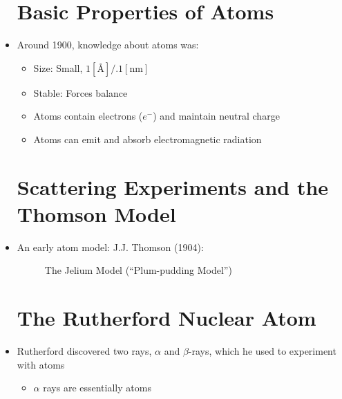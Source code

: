\begin{itemize}

    \section{Basic Properties of Atoms}

  \item Around 1900, knowledge about atoms was:

    \begin{itemize}

      \item Size: Small, $1[\si{\angstrom}]/.1[\si{\nano\meter}]$

      \item Stable: Forces balance

      \item Atoms contain electrons ($e^-$) and maintain neutral charge

      \item Atoms can emit and absorb electromagnetic radiation

    \end{itemize}

    \section{Scattering Experiments and the Thomson Model}

  \item An early atom model: J.J. Thomson (1904):

    \begin{figure}[h!]
      \centering
      
      \caption{The Jelium Model (``Plum-pudding Model'')}
      \label{fig:1}
    \end{figure}

    \section{The Rutherford Nuclear Atom}

  \item Rutherford discovered two rays, $\alpha$ and $\beta$-rays, which he used to experiment with atoms

    \begin{itemize}

      \item $\alpha$ rays are essentially  atoms

        \begin{itemize}


\end{itemize}
\end{itemize}
\end{itemize}

